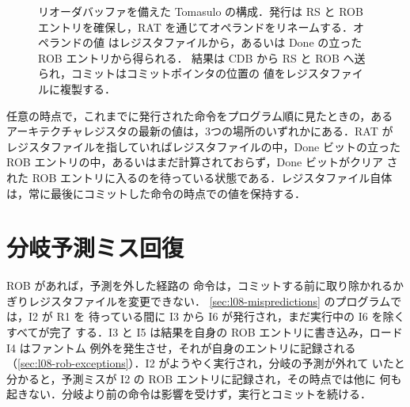 \documentclass[../main.tex]{subfiles}
\begin{document}
\begin{figure}[htbp]
  \centering
  
  \caption{リオーダバッファを備えた Tomasulo の構成．発行は RS と ROB
    エントリを確保し，RAT を通じてオペランドをリネームする．オペランドの値
    はレジスタファイルから，あるいは Done の立った ROB エントリから得られる．
    結果は CDB から RS と ROB へ送られ，コミットはコミットポインタの位置の
    値をレジスタファイルに複製する．}
  \label{fig:l08-organization}
\end{figure}

\begin{note}
  任意の時点で，これまでに発行された命令をプログラム順に見たときの，ある
  アーキテクチャレジスタの最新の値は，3つの場所のいずれかにある．RAT が
  レジスタファイルを指していればレジスタファイルの中，Done ビットの立った
  ROB エントリの中，あるいはまだ計算されておらず，Done ビットがクリア
  された ROB エントリに入るのを待っている状態である．レジスタファイル自体
  は，常に最後にコミットした命令の時点での値を保持する．
\end{note}

\section{分岐予測ミス回復}
\label{sec:l08-recovery}

ROB があれば，予測を外した経路の
命令は，コミットする前に取り除かれるかぎりレジスタファイルを変更できない．%
\cref{sec:l08-mispredictions} のプログラムでは，I2 が R1 を
待っている間に I3 から I6 が発行され，まだ実行中の I6 を除くすべてが完了
する．I3 と I5 は結果を自身の ROB エントリに書き込み，ロード I4 はファントム
例外を発生させ，それが自身のエントリに記録される
（\cref{sec:l08-rob-exceptions}）．I2 がようやく実行され，分岐の予測が外れて
いたと分かると，予測ミスが I2 の ROB エントリに記録され，その時点では他に
何も起きない．分岐より前の命令は影響を受けず，実行とコミットを続ける．%
\end{document}
